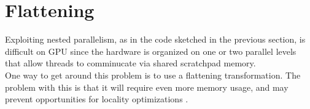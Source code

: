 \section{Flattening}
Exploiting nested parallelism, as in the code sketched in the previous section, is difficult on GPU since the hardware is organized on one or two parallel levels that allow threads to comminucate via shared scratchpad memory. \\
One way to get around this problem is to use a flattening transformation. The problem with this is that it will require even more memory usage, and may prevent opportunities for locality optimizations .
